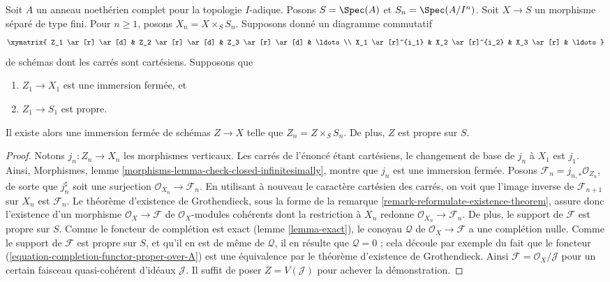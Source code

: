 \begin{lemma}
\label{lemma-algebraize-formal-closed-subscheme}
Soit $A$ un anneau noethérien complet pour la topologie $I$-adique.
Posons $S = \Spec(A)$ et $S_n = \Spec(A/I^n)$.
Soit $X \to S$ un morphisme séparé de type fini.
Pour $n \geq 1$, posons $X_n = X \times_S S_n$.
Supposons donné un diagramme commutatif
$$
\xymatrix{
Z_1 \ar[r] \ar[d] & Z_2 \ar[r] \ar[d] & Z_3 \ar[r] \ar[d] & \ldots \\
X_1 \ar[r]^{i_1} & X_2 \ar[r]^{i_2} & X_3 \ar[r] & \ldots
}
$$
de schémas dont les carrés sont cartésiens. Supposons que
\begin{enumerate}
\item $Z_1 \to X_1$ est une immersion fermée, et
\item $Z_1 \to S_1$ est propre.
\end{enumerate}
Il existe alors une immersion fermée de schémas $Z \to X$ telle que
$Z_n = Z \times_S S_n$. De plus, $Z$ est propre sur $S$.
\end{lemma}

\begin{proof}
Notons $j_n : Z_n \to X_n$ les morphismes verticaux.
Les carrés de l'énoncé étant cartésiens,
le changement de base de $j_n$ à $X_1$ est $j_1$.
Ainsi, Morphismes, lemme \ref{morphisms-lemma-check-closed-infinitesimally},
montre que $j_n$ est une immersion fermée.
Posons $\mathcal{F}_n = j_{n, *}\mathcal{O}_{Z_n}$, de sorte que
$j_n^\sharp$ soit une surjection $\mathcal{O}_{X_n} \to \mathcal{F}_n$.
En utilisant à nouveau le caractère cartésien des carrés, on voit que
l'image inverse de $\mathcal{F}_{n + 1}$ sur $X_n$ est $\mathcal{F}_n$.
Le théorème d'existence de Grothendieck, sous la forme de la
remarque \ref{remark-reformulate-existence-theorem},
assure donc l'existence d'un morphisme
$\mathcal{O}_X \to \mathcal{F}$
de $\mathcal{O}_X$-modules cohérents dont la restriction à
$X_n$ redonne $\mathcal{O}_{X_n} \to \mathcal{F}_n$.
De plus, le support de $\mathcal{F}$ est propre sur $S$.
Comme le foncteur de complétion est exact (lemme \ref{lemma-exact}),
le conoyau $\mathcal{Q}$ de $\mathcal{O}_X \to \mathcal{F}$
a une complétion nulle. Comme le support de $\mathcal{F}$ est propre
sur $S$, et qu'il en est de même de $\mathcal{Q}$, il en résulte que
$\mathcal{Q} = 0$ ; cela découle par exemple du fait que le
foncteur (\ref{equation-completion-functor-proper-over-A}) est une équivalence par
le théorème d'existence de Grothendieck.
Ainsi $\mathcal{F} = \mathcal{O}_X/\mathcal{J}$
pour un certain faisceau quasi-cohérent d'idéaux $\mathcal{J}$. Il
suffit de poser $Z = V(\mathcal{J})$ pour achever la démonstration.
\end{proof}

